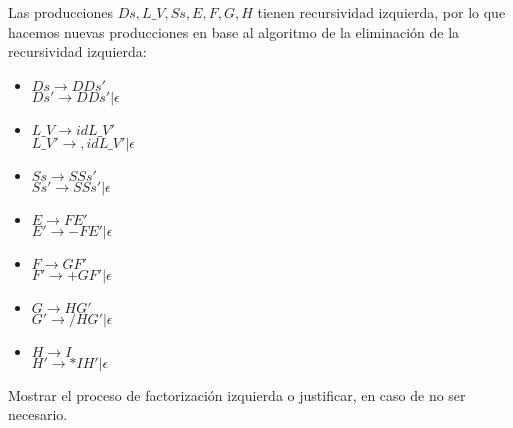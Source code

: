 \documentclass[letterpaper,12pt,titlepage]{article}
\begin{document}
\begin{enumerate}
Las producciones $Ds, L\_V, Ss, E, F, G, H$ tienen recursividad izquierda, por lo que hacemos nuevas producciones en base al algoritmo de la eliminación de la recursividad izquierda:
\begin{itemize}
    \item $Ds\rightarrow D Ds'$\\
    $Ds'\rightarrow D Ds'|\epsilon$
    \item $L\_V\rightarrow id L\_V'$\\
    $L\_V'\rightarrow ,id L\_V'|\epsilon$
    \item $Ss\rightarrow S Ss'$\\
    $Ss'\rightarrow S Ss'|\epsilon$
    \item $E\rightarrow F E'$\\
    $E'\rightarrow -F E'|\epsilon$
    \item $F\rightarrow GF'$\\
    $F'\rightarrow +G F'|\epsilon$
    \item $G\rightarrow H G'$\\
    $G'\rightarrow /H G'|\epsilon$
    \item $H\rightarrow I$\\
    $H'\rightarrow *I H'|\epsilon$
\end{itemize}
{\bfseries \item \boldmath Mostrar el proceso de factorización izquierda o justificar, en caso de no ser necesario.}


\end{enumerate}
\end{document}
